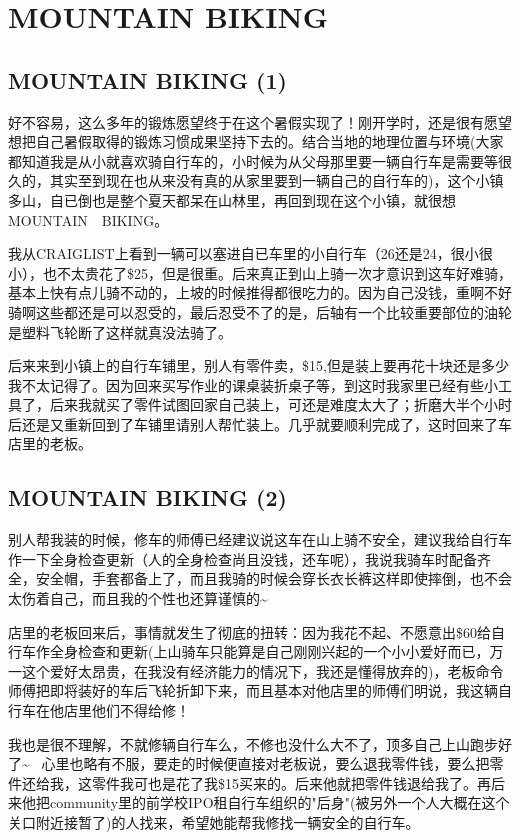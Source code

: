 \documentclass[12pt]{book}
\begin{document}
\chapter{MOUNTAIN BIKING}
\label{sec-16}
\section{MOUNTAIN BIKING (1)}
\label{sec-16-1}

好不容易，这么多年的锻炼愿望终于在这个暑假实现了！刚开学时，还是很有愿望想把自己暑假取得的锻炼习惯成果坚持下去的。结合当地的地理位置与环境(大家都知道我是从小就喜欢骑自行车的，小时候为从父母那里要一辆自行车是需要等很久的，其实至到现在也从来没有真的从家里要到一辆自己的自行车的)，这个小镇多山，自已倒也是整个夏天都呆在山林里，再回到现在这个小镇，就很想MOUNTAIN　BIKING。

我从CRAIGLIST上看到一辆可以塞进自已车里的小自行车（26还是24，很小很小），也不太贵花了\$25，但是很重。后来真正到山上骑一次才意识到这车好难骑，基本上快有点儿骑不动的，上坡的时候推得都很吃力的。因为自己没钱，重啊不好骑啊这些都还是可以忍受的，最后忍受不了的是，后轴有一个比较重要部位的油轮是塑料飞轮断了这样就真没法骑了。

后来来到小镇上的自行车铺里，别人有零件卖，\$15,但是装上要再花十块还是多少我不太记得了。因为回来买写作业的课桌装折桌子等，到这时我家里已经有些小工具了，后来我就买了零件试图回家自己装上，可还是难度太大了；折磨大半个小时后还是又重新回到了车铺里请别人帮忙装上。几乎就要顺利完成了，这时回来了车店里的老板。

\section{MOUNTAIN BIKING (2)}
\label{sec-16-2}

别人帮我装的时候，修车的师傅已经建议说这车在山上骑不安全，建议我给自行车作一下全身检查更新（人的全身检查尚且没钱，还车呢），我说我骑车时配备齐全，安全帽，手套都备上了，而且我骑的时候会穿长衣长裤这样即使摔倒，也不会太伤着自己，而且我的个性也还算谨慎的\textasciitilde{}~ 

店里的老板回来后，事情就发生了彻底的扭转：因为我花不起、不愿意出\$60给自行车作全身检查和更新(上山骑车只能算是自己刚刚兴起的一个小小爱好而已，万一这个爱好太昂贵，在我没有经济能力的情况下，我还是懂得放弃的)，老板命令师傅把即将装好的车后飞轮折卸下来，而且基本对他店里的师傅们明说，我这辆自行车在他店里他们不得给修！

我也是很不理解，不就修辆自行车么，不修也没什么大不了，顶多自己上山跑步好了\textasciitilde{}~ 心里也略有不服，要走的时候便直接对老板说，要么退我零件钱，要么把零件还给我，这零件我可也是花了我\$15买来的。后来他就把零件钱退给我了。再后来他把community里的前学校IPO租自行车组织的"后身"(被另外一个人大概在这个关口附近接暂了)的人找来，希望她能帮我修找一辆安全的自行车。
\end{document}
